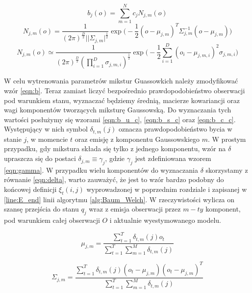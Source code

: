 \documentclass[shortabstract, mgr]{iithesis}
\begin{document}
	   \begin{equation}
		   	b_j(o) = \sum_{m=1}^N c_j N_{j,m}(o)
		   	\label{eqn:GMM}
	   \end{equation}
	   \begin{equation}
		   N_{j,m}(o)=\frac{1}{(2\pi)^{\frac{D}{2}}||\Sigma_{j,m}|^{\frac{1}{2}}}\exp\bigg( -\frac{1}{2}(o-\mu_{j,m})^T\Sigma_{j,m}^{-1}(o-\mu_{j,m}) \bigg)
		   \label{eqn:normal_distribution}
	   \end{equation}	
	   \begin{equation}
		   N_{j,m}(o)\simeq\frac{1}{(2\pi)^{\frac{D}{2}}(\prod_{i=1}^D\sigma_{j,m,i})^{\frac{1}{2}}}\exp\bigg( -\frac{1}{2}\sum_{i=1}^D(o_i-\mu_{j,m,i})^2\sigma_{j,m,i} \bigg)
	   \label{eqn:normal_distribution_simple}
	   \end{equation}
	   
	   W celu wytrenowania parametrów mikstur Guassowkich należy zmodyfikować wzór \ref{eqn:b}. Teraz zamiast liczyć bezpośrednio prawdopodobieństwo obserwacji pod warunkiem stanu, wyznaczać będziemy średnią, macierze kowariancji oraz wagi komponentów tworzących miksturę Gaussowską. Do wyznaczania tych wartości posłużymy się wzorami \ref{eqn:b_u_c}, \ref{eqn:b_s_c} oraz \ref{eqn:b_c_c}. Występujący w nich symbol $\delta_{t,m}(j)$ oznacza prawdopodobieństwo bycia w stanie $j$, w momencie $t$ oraz emisję z komponentu Gaussowskiego $m$. W prostym przypadku, gdy mikstura składa się tylko z jednego komponentu, wzór na $\delta$ upraszcza się do postaci $\delta_{j,m} \equiv \gamma_j$, gdzie $\gamma_j$ jest zdefiniowana wzorem \ref{eqn:gamma}. W przypadku wielu komponentów do wyznaczania $\delta$ skorzystamy z równanie \ref{eqn:delta}, warto zauważyć, że jest to wzór bardzo podobny do końcowej definicji $\xi _t(i,j)$ wyprowadzonej w poprzednim rozdziale i zapisanej w \ref{line:E_end} linii algorytmu \ref{alg:Baum_Welch}. W rzeczywistości wylicza on szansę przejścia do stanu $q_j$ wraz z emisja obserwacji przez $m-ty$ komponent, pod warunkiem całej obserwacji $O$ i aktualnie wyestymowanego modelu.
	   
	   \begin{equation}
	   \mu_{j,m}=\frac{\sum_{t=1}^T\delta_{t,m}(j)o_t}{\sum_{t=1}^T\sum_{m=1}^M\delta_{t,m}(j)}
	   \label{eqn:b_u_c}
	   \end{equation}
	   
	   \begin{equation}
	   \Sigma_{j,m}=\frac{\sum_{t=1}^T\delta_{t,m}(j)(o_t-\mu_{j,m})(o_t-\mu_{j,m})^T}{\sum_{t=1}^T\sum_{m=1}^M\delta_{t,m}(j)}
	   \label{eqn:b_s_c}
	   \end{equation}
	   
\end{document}

